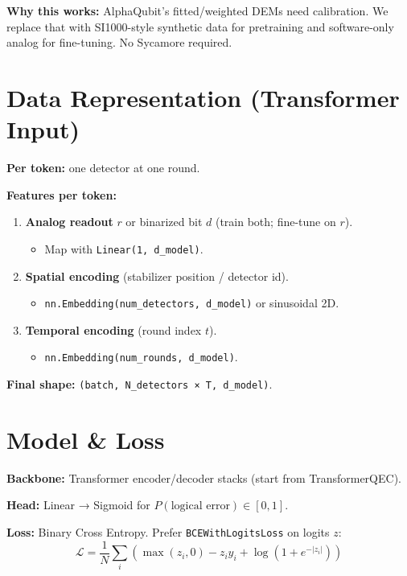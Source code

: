 \documentclass[12pt]{article}
\begin{document}
\textbf{Why this works:} AlphaQubit's fitted/weighted DEMs need calibration. We replace that with SI1000-style synthetic data for pretraining and software-only analog for fine-tuning. No Sycamore required.

\section{Data Representation (Transformer Input)}
\label{sec:data_rep}

\textbf{Per token:} one detector at one round.

\textbf{Features per token:}
\begin{enumerate}
    \item \textbf{Analog readout} $r$ or binarized bit $d$ (train both; fine-tune on $r$).
    \begin{itemize}
        \item Map with \texttt{Linear(1, d\_model)}.
    \end{itemize}
    
    \item \textbf{Spatial encoding} (stabilizer position / detector id).
    \begin{itemize}
        \item \texttt{nn.Embedding(num\_detectors, d\_model)} or sinusoidal 2D.
    \end{itemize}
    
    \item \textbf{Temporal encoding} (round index $t$).
    \begin{itemize}
        \item \texttt{nn.Embedding(num\_rounds, d\_model)}.
    \end{itemize}
\end{enumerate}

\textbf{Final shape:} \texttt{(batch, N\_detectors × T, d\_model)}.

\section{Model \& Loss}

\textbf{Backbone:} Transformer encoder/decoder stacks (start from TransformerQEC).

\textbf{Head:} Linear → Sigmoid for $P(\text{logical error}) \in [0,1]$.

\textbf{Loss:} Binary Cross Entropy. Prefer \texttt{BCEWithLogitsLoss} on logits $z$:
\begin{equation}
\mathcal{L} = \frac{1}{N} \sum_i \left( \max(z_i, 0) - z_i y_i + \log(1 + e^{-|z_i|}) \right)
\end{equation}
\end{document}
